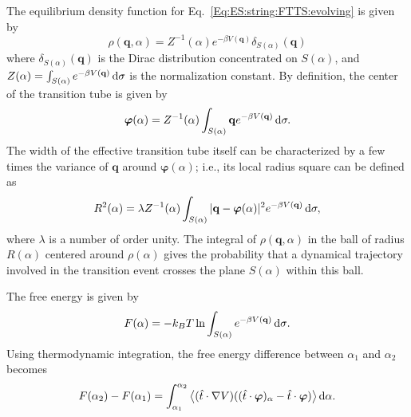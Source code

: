The equilibrium density function for Eq.~\ref{Eq:ES:string:FTTS:evolving} is given by
\begin{equation}
	\rho(\mathbf{q},\alpha)=Z^{-1}(\alpha)e^{-\beta V(\mathbf{q})}\delta_{S(\alpha)}(\mathbf{q})
\end{equation}
where $\delta_{S(\alpha)}(\mathbf{q})$ is the Dirac distribution concentrated on $S(\alpha)$, and $Z(\alpha)=\int_{S(\alpha)}e^{-\beta V(\mathbf{q})}\mathop{}\!\mathrm{d} \sigma$ is the normalization constant. By definition, the center of the transition tube is given by
\begin{equation}
	\boldsymbol{\varphi}(\alpha)=Z^{-1}(\alpha)\int_{S(\alpha)}\mathbf{q}e^{-\beta V(\mathbf{q})}\mathop{}\!\mathrm{d} \sigma.
\end{equation}
The width of the effective transition tube itself can be characterized by a few times the variance of $\mathbf{q}$ around $\boldsymbol{\varphi}(\alpha)$; i.e., its local radius square can be defined as
\begin{equation}
	R^2(\alpha)=\lambda Z^{-1}(\alpha)\int_{S(\alpha)}|\mathbf{q}-\boldsymbol{\varphi}(\alpha)|^2e^{-\beta V(\mathbf{q})}\mathop{}\!\mathrm{d}\sigma,
\end{equation}
where $\lambda$ is a number of order unity. The integral of $\rho(\mathbf{q},\alpha)$ in the ball of radius $R(\alpha)$ centered around $\rho(\alpha)$ gives the probability that a dynamical trajectory involved in the transition event crosses the plane $S(\alpha)$ within this ball.

The free energy is given by
\begin{equation}
	F(\alpha)=-k_BT\ln{\int_{S(\alpha)}e^{-\beta V(\mathbf{q})}\mathop{}\!\mathrm{d}\sigma}.
\end{equation}
Using thermodynamic integration, the free energy difference between $\alpha_1$ and $\alpha_2$ becomes
\begin{equation}
	F(\alpha_2)-F(\alpha_1)=\int_{\alpha_1}^{\alpha_2}\left<(\hat{t}\cdot\nabla V)((\hat{t}\cdot\boldsymbol{\varphi})_\alpha-\hat{t}\cdot\boldsymbol{\varphi})\right>\mathop{}\!\mathrm{d}\alpha.
\end{equation}

